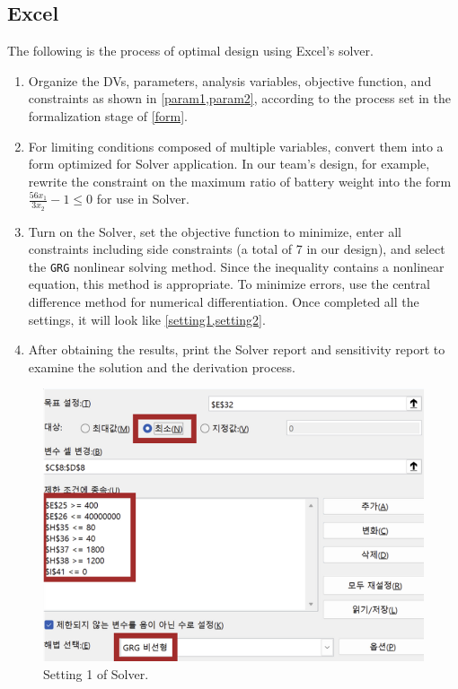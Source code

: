 \documentclass[11pt,twocolumn]{article}
\begin{document}
        \subsection{Excel}
            \label{methodExcel}
            The following is the process of optimal design using Excel's solver.
            \begin{enumerate}
                \item Organize the DVs, parameters, analysis variables, objective function, and constraints as shown in \cref{param1,param2}, according to the process set in the formalization stage of \cref{form}.
                \item For limiting conditions composed of multiple variables, convert them into a form optimized for Solver application. In our team's design, for example, rewrite the constraint on the maximum ratio of battery weight into the form $\frac{56x_1}{3x_2}-1\leq 0$ for use in Solver.
                \item Turn on the Solver, set the objective function to minimize, enter all constraints including side constraints (a total of 7 in our design), and select the \texttt{GRG} nonlinear solving method. Since the inequality contains a nonlinear equation, this method is appropriate. To minimize errors, use the central difference method for numerical differentiation. Once completed all the settings, it will look like \cref{setting1,setting2}.
                \item After obtaining the results, print the Solver report and sensitivity report to examine the solution and the derivation process.
            \end{enumerate}
            \begin{figure}[h]
                \centering
                    \centering
                    \includegraphics[width=.8\columnwidth]{Excel33.png}
                    \caption{Setting 1 of Solver.}
                    \label{setting1}
            \end{figure}
\end{document}
